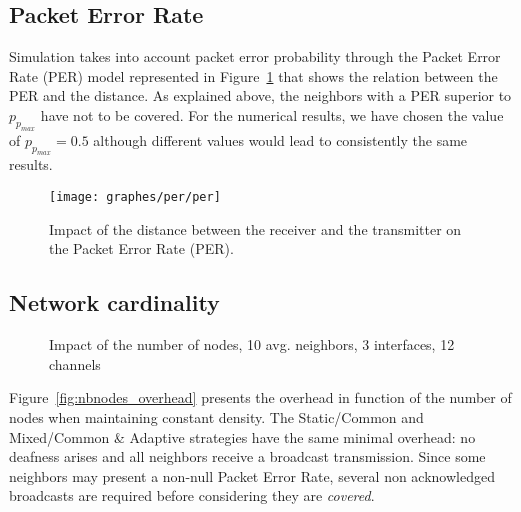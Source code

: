 \documentclass[twoside]{article}
\begin{document}
\subsection{Packet Error Rate}

Simulation takes into account packet error probability through the Packet Error
Rate (PER) model represented in Figure~\ref{fig:per}  
\cite{camp06} that shows the relation between the PER and the distance.
As explained above, the neighbors with a PER superior to $p_{p_{max}}$ have not
to be covered. 
For the numerical results, we have chosen the value of $p_{p_{max}}=0.5$ although different values would lead to consistently the same results.





\begin{figure}
\centering
	\texttt{[image: graphes/per/per]}
 	\caption{Impact of the distance between the receiver and the transmitter on the Packet Error Rate (PER).}
	\label{fig:per}
\end{figure}





\subsection{Network cardinality}

\begin{figure}[t!]
\begin{center}
	\caption{Impact of the number of nodes, 10 avg. neighbors, 3 interfaces, 12 channels}
\end{center}
\end{figure}



Figure~\ref{fig:nbnodes_overhead} presents the overhead in function of the number
of nodes when maintaining constant density. 
The Static/Common and Mixed/Common \& Adaptive strategies have the same minimal
overhead: no deafness arises and all neighbors receive a broadcast transmission. 
Since some neighbors may present a non-null Packet Error Rate, several non acknowledged broadcasts are required before considering they are \emph{covered}. 
\end{document}
